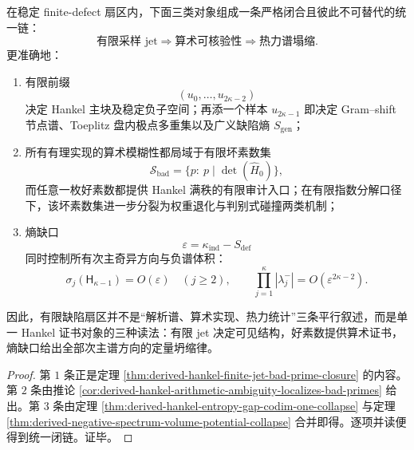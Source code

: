 \begin{theorem}\label{thm:derived-hankel-sampling-badprime-entropy-unified}
在稳定 finite-defect 扇区内，下面三类对象组成一条严格闭合且彼此不可替代的统一链：
\[
\boxed{
\text{有限采样 jet}
\Longrightarrow
\text{算术可核验性}
\Longrightarrow
\text{热力谱塌缩}.
}
\]
更准确地：
\begin{enumerate}
\normalfont
  \item 有限前缀
  \[
  (u_0,\dots,u_{2\kappa-2})
  \]
  决定 Hankel 主块及稳定负子空间；再添一个样本 \(u_{2\kappa-1}\) 即决定 Gram--shift 节点谱、Toeplitz 盘内极点多重集以及广义缺陷熵 \(S_{\mathrm{gen}}\)；
  \item 所有有理实现的算术模糊性都局域于有限坏素数集
  \[
  \mathcal S_{\mathrm{bad}}=\{p:\ p\mid \det(\widehat H_0)\},
  \]
  而任意一枚好素数都提供 Hankel 满秩的有限审计入口；在有限指数分解口径下，该坏素数集进一步分裂为权重退化与判别式碰撞两类机制；
  \item 熵缺口
  \[
  \varepsilon=\kappa_{\mathrm{ind}}-S_{\mathrm{def}}
  \]
  同时控制所有次主奇异方向与负谱体积：
  \[
  \sigma_j(\mathsf H_{\kappa-1})=O(\varepsilon)\quad (j\ge 2),
  \qquad
  \prod_{j=1}^{\kappa}|\lambda^-_j|=O(\varepsilon^{2\kappa-2}).
  \]
\end{enumerate}
因此，有限缺陷扇区并不是“解析谱、算术实现、热力统计”三条平行叙述，而是单一 Hankel 证书对象的三种读法：有限 jet 决定可见结构，好素数提供算术证书，熵缺口给出全部次主谱方向的定量坍缩律。
\end{theorem}

\begin{proof}
第 \(1\) 条正是定理 \ref{thm:derived-hankel-finite-jet-bad-prime-closure} 的内容。第 \(2\) 条由推论 \ref{cor:derived-hankel-arithmetic-ambiguity-localizes-bad-primes} 给出。第 \(3\) 条由定理 \ref{thm:derived-hankel-entropy-gap-codim-one-collapse} 与定理 \ref{thm:derived-negative-spectrum-volume-potential-collapse} 合并即得。逐项并读便得到统一闭链。证毕。
\end{proof}

\endinput
